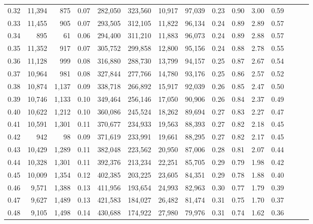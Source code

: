 \begin{tabular}{rrrrrrrrrrrrrrr}
0.32 &  11,394 &    875 &  0.07 &  282,050 &  323,560 &   10,917 &   97,039 &  0.23 &  0.90 &  3.00 &      0.59 \\
0.33 &  11,455 &    905 &  0.07 &  293,505 &  312,105 &   11,822 &   96,134 &  0.24 &  0.89 &  2.89 &      0.57 \\
0.34 &     895 &     61 &  0.06 &  294,400 &  311,210 &   11,883 &   96,073 &  0.24 &  0.89 &  2.88 &      0.57 \\
0.35 &  11,352 &    917 &  0.07 &  305,752 &  299,858 &   12,800 &   95,156 &  0.24 &  0.88 &  2.78 &      0.55 \\
0.36 &  11,128 &    999 &  0.08 &  316,880 &  288,730 &   13,799 &   94,157 &  0.25 &  0.87 &  2.67 &      0.54 \\
0.37 &  10,964 &    981 &  0.08 &  327,844 &  277,766 &   14,780 &   93,176 &  0.25 &  0.86 &  2.57 &      0.52 \\
0.38 &  10,874 &  1,137 &  0.09 &  338,718 &  266,892 &   15,917 &   92,039 &  0.26 &  0.85 &  2.47 &      0.50 \\
0.39 &  10,746 &  1,133 &  0.10 &  349,464 &  256,146 &   17,050 &   90,906 &  0.26 &  0.84 &  2.37 &      0.49 \\
0.40 &  10,622 &  1,212 &  0.10 &  360,086 &  245,524 &   18,262 &   89,694 &  0.27 &  0.83 &  2.27 &      0.47 \\
0.41 &  10,591 &  1,301 &  0.11 &  370,677 &  234,933 &   19,563 &   88,393 &  0.27 &  0.82 &  2.18 &      0.45 \\
0.42 &     942 &     98 &  0.09 &  371,619 &  233,991 &   19,661 &   88,295 &  0.27 &  0.82 &  2.17 &      0.45 \\
0.43 &  10,429 &  1,289 &  0.11 &  382,048 &  223,562 &   20,950 &   87,006 &  0.28 &  0.81 &  2.07 &      0.44 \\
0.44 &  10,328 &  1,301 &  0.11 &  392,376 &  213,234 &   22,251 &   85,705 &  0.29 &  0.79 &  1.98 &      0.42 \\
0.45 &  10,009 &  1,354 &  0.12 &  402,385 &  203,225 &   23,605 &   84,351 &  0.29 &  0.78 &  1.88 &      0.40 \\
0.46 &   9,571 &  1,388 &  0.13 &  411,956 &  193,654 &   24,993 &   82,963 &  0.30 &  0.77 &  1.79 &      0.39 \\
0.47 &   9,627 &  1,489 &  0.13 &  421,583 &  184,027 &   26,482 &   81,474 &  0.31 &  0.75 &  1.70 &      0.37 \\
0.48 &   9,105 &  1,498 &  0.14 &  430,688 &  174,922 &   27,980 &   79,976 &  0.31 &  0.74 &  1.62 &      0.36 \\

\end{tabular}
